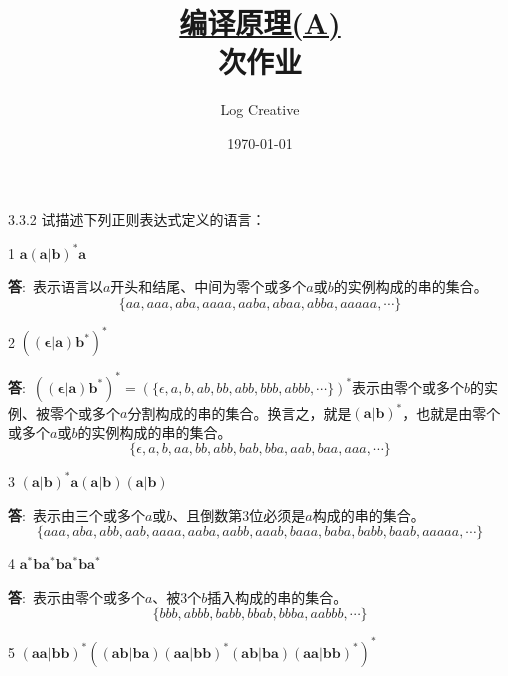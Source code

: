 \documentclass[12pt,a4paper]{article}
\newenvironment{problems}{\begin{list}{}{\renewcommand{\makelabel}[1]{\textbf{##1}\hfil}}}{\end{list}}
\newenvironment{steps}{\begin{list}{}{\renewcommand{\makelabel}[1]{##1)\hfil}}}{\end{list}}
\providecommand{\ans}{\textbf{答}:~}
\begin{document}
\title{\normalsize \underline{编译原理(A)}\\ 次作业}
\author{Log Creative }
\date{\today}
\maketitle

\begin{problems}
    \item[3.3.2] 试描述下列正则表达式定义的语言：
    \begin{steps}
        \item[1] $\mathbf{a(a|b)^*a}$
         
        \ans 表示语言以$a$开头和结尾、中间为零个或多个$a$或$b$的实例构成的串的集合。
        \begin{equation*}
            \{aa,aaa,aba,aaaa,aaba,abaa,abba,aaaaa,\cdots\}
        \end{equation*}
        \item[2] $\mathbf{((\epsilon|a)b^*)^*}$ 
        
        \ans $\mathbf{((\epsilon|a)b^*)^*}=(\{\epsilon,a,b,ab,bb,abb,bbb,abbb,\cdots\})^*$表示由零个或多个$b$的实例、被零个或多个$a$分割构成的串的集合。换言之，就是$\mathbf{(a|b)^*}$，也就是由零个或多个$a$或$b$的实例构成的串的集合。
        \begin{equation*}
            \{\epsilon,a,b,aa,bb,abb,bab,bba,aab,baa,aaa,\cdots\}
        \end{equation*}
        \item[3] $\mathbf{(a|b)^*a(a|b)(a|b)}$
        
        \ans 表示由三个或多个$a$或$b$、且倒数第3位必须是$a$构成的串的集合。
        \begin{equation*}
            \{aaa,aba,abb,aab,aaaa,aaba,aabb,aaab,baaa,baba,babb,baab,aaaaa,\cdots\}
        \end{equation*}
        \item[4] $\mathbf{a^*ba^*ba^*ba^*}$
        
        \ans 表示由零个或多个$a$、被3个$b$插入构成的串的集合。
        \begin{equation*}
            \{bbb,abbb,babb,bbab,bbba,aabbb,\cdots\}
        \end{equation*}
        \item[5] $\mathbf{(aa|bb)^*((ab|ba)(aa|bb)^*(ab|ba)(aa|bb)^*)^*}$ 
        

\end{steps}
\end{problems}
\end{document}
